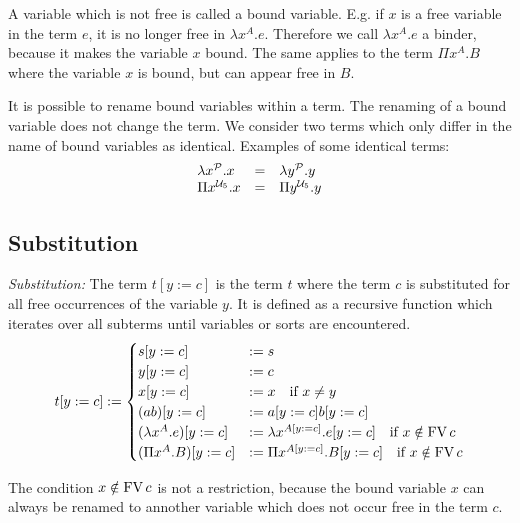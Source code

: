 A variable which is not free is called a bound variable. E.g. if $x$ is a free
variable in the term $e$, it is no longer free in $\lambda x^A. e$. Therefore we
call $\lambda x^A. e$ a binder, because it makes the variable $x$ bound. The
same applies to the term $\Pi x^A. B$  where the variable $x$ is bound, but can
appear free in $B$.


It is possible to rename bound variables within a term. The renaming of a bound
variable does not change the term. We consider two terms which only differ in
the name of bound variables as identical. Examples of some identical terms:
$$
\begin{array}{lll}
    \lambda x^\Prop. x  &=& \lambda y^\Prop. y

    \\

    \Pi x^{\Any_5}. x   &=& \Pi y^{\Any_5}. y
\end{array}
$$



\subsection{Substitution}


\begin{definition}
    \emph{Substitution:}
    The term $t[y:=c]$ is the term $t$ where the term $c$ is substituted for all
    free occurrences of the variable $y$. It is defined as a recursive function
    which iterates over all subterms until variables or sorts are encountered.
    $$
    t[y:=c] :=
        \begin{cases}
            s[y:=c] &:= s

            \\

            y[y:=c] &:= c

            \\

            x[y:=c] &:= x \quad \text{if } x \ne y

            \\

            (a b)[y:=c] &:= a[y:=c] b[y:=c]

            \\

            (\lambda x^A . e)[y:=c]
            &:=
            \lambda x^{A[y:=c]}. e[y:=c]
                \quad \text{if } x \notin \FV c

            \\

            (\Pi x^A . B)[y:=c]
            &:=
            \Pi x^{A[y:=c]}. B[y:=c]
                \quad \text{if } x \notin \FV c
        \end{cases}
    $$
\end{definition}
The condition $x \notin \FV c$ is not a restriction, because the bound variable
$x$ can always be renamed to annother variable which does not occur free in the
term $c$.



